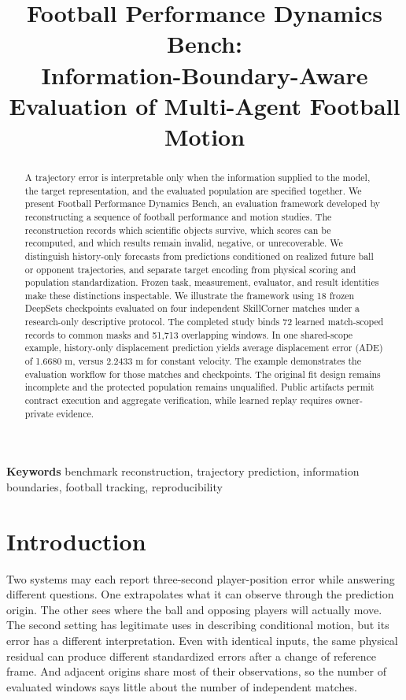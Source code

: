 \documentclass[10pt]{article}
\title{Football Performance Dynamics Bench:\\ Information-Boundary-Aware Evaluation of Multi-Agent Football Motion}
\author{}
\begin{document}
\maketitle

\begin{abstract}
A trajectory error is interpretable only when the information supplied to the model, the target representation, and the evaluated population are specified together. We present Football Performance Dynamics Bench, an evaluation framework developed by reconstructing a sequence of football performance and motion studies. The reconstruction records which scientific objects survive, which scores can be recomputed, and which results remain invalid, negative, or unrecoverable. We distinguish history-only forecasts from predictions conditioned on realized future ball or opponent trajectories, and separate target encoding from physical scoring and population standardization. Frozen task, measurement, evaluator, and result identities make these distinctions inspectable. We illustrate the framework using 18 frozen DeepSets checkpoints evaluated on four independent SkillCorner matches under a research-only descriptive protocol. The completed study binds 72 learned match-scoped records to common masks and 51,713 overlapping windows. In one shared-scope example, history-only displacement prediction yields average displacement error (ADE) of 1.6680 m, versus 2.2433 m for constant velocity. The example demonstrates the evaluation workflow for those matches and checkpoints. The original fit design remains incomplete and the protected population remains unqualified. Public artifacts permit contract execution and aggregate verification, while learned replay requires owner-private evidence.
\end{abstract}

\noindent\textbf{Keywords} \quad benchmark reconstruction, trajectory prediction, information boundaries, football tracking, reproducibility

\section{Introduction}

Two systems may each report three-second player-position error while answering different questions. One extrapolates what it can observe through the prediction origin. The other sees where the ball and opposing players will actually move. The second setting has legitimate uses in describing conditional motion, but its error has a different interpretation. Even with identical inputs, the same physical residual can produce different standardized errors after a change of reference frame. And adjacent origins share most of their observations, so the number of evaluated windows says little about the number of independent matches.
\end{document}
